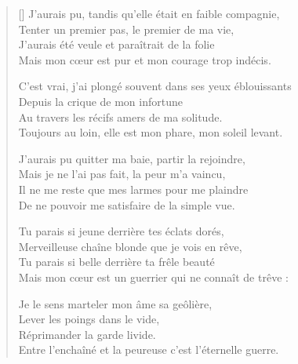 \settowidth{\versewidth}{C'est vrai, j'ai plongé souvent dans ses yeux éblouissants}
\begin{verse}[\versewidth]
J'aurais pu, tandis qu'elle était en faible compagnie, \\
Tenter un premier pas, le premier de ma vie, \\
J'aurais été veule et paraîtrait de la folie \\
Mais mon cœur est pur et mon courage trop indécis.

C'est vrai, j'ai plongé souvent dans ses yeux éblouissants \\
Depuis la crique de mon infortune \\
Au travers les récifs amers de ma solitude. \\
Toujours au loin, elle est mon phare, mon soleil levant.

J'aurais pu quitter ma baie, partir la rejoindre, \\
Mais je ne l'ai pas fait, la peur m'a vaincu, \\
Il ne me reste que mes larmes pour me plaindre \\
De ne pouvoir me satisfaire de la simple vue.

Tu parais si jeune derrière tes éclats dorés, \\
Merveilleuse chaîne blonde que je vois en rêve, \\
Tu parais si belle derrière ta frêle beauté \\
Mais mon cœur est un guerrier qui ne connaît de trêve :

Je le sens marteler mon âme sa geôlière, \\
Lever les poings dans le vide, \\
Réprimander la garde livide. \\
Entre l'enchaîné et la peureuse c'est l'éternelle guerre.

\end{verse}

\newpage

